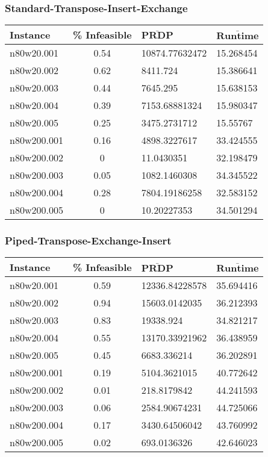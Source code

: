 \begin{homeworkProblem}
\subsubsection{Standard-Transpose-Insert-Exchange}
\begin{center}
\begin{tabular}{|l|c|l|l|}
\hline
\textbf{Instance}& \textbf{\% Infeasible} & $\mathbf{\bar{PRDP}}$ &$\mathbf{\bar{Runtime}}$\\
\hline
n80w20.001&0.54&10874.77632472&15.268454\\
\hline
n80w20.002&0.62&8411.724&15.386641\\
\hline
n80w20.003&0.44&7645.295&15.638153\\
\hline
n80w20.004&0.39&7153.68881324&15.980347\\
\hline
n80w20.005&0.25&3475.2731712&15.55767\\
\hline
n80w200.001&0.16&4898.3227617&33.424555\\
\hline
n80w200.002&0&11.0430351&32.198479\\
\hline
n80w200.003&0.05&1082.1460308&34.345522\\
\hline
n80w200.004&0.28&7804.19186258&32.583152\\
\hline
n80w200.005&0&10.20227353&34.501294\\
\hline
\end{tabular}
\label{tab:s.tie}
\end{center}

\subsubsection{Piped-Transpose-Exchange-Insert}
\begin{center}
\begin{tabular}{|l|c|l|l|}
\hline
\textbf{Instance}& \textbf{\% Infeasible} & $\mathbf{\bar{PRDP}}$ &$\mathbf{\bar{Runtime}}$\\
\hline
n80w20.001&0.59&12336.84228578&35.694416\\
\hline
n80w20.002&0.94&15603.0142035&36.212393\\
\hline
n80w20.003&0.83&19338.924&34.821217\\
\hline
n80w20.004&0.55&13170.33921962&36.438959\\
\hline
n80w20.005&0.45&6683.336214&36.202891\\
\hline
n80w200.001&0.19&5104.3621015&40.772642\\
\hline
n80w200.002&0.01&218.8179842&44.241593\\
\hline
n80w200.003&0.06&2584.90674231&44.725066\\
\hline
n80w200.004&0.17&3430.64506042&43.760992\\
\hline
n80w200.005&0.02&693.0136326&42.646023\\
\hline
\end{tabular}
\label{tab:p.tei}
\end{center}


\end{homeworkProblem}
